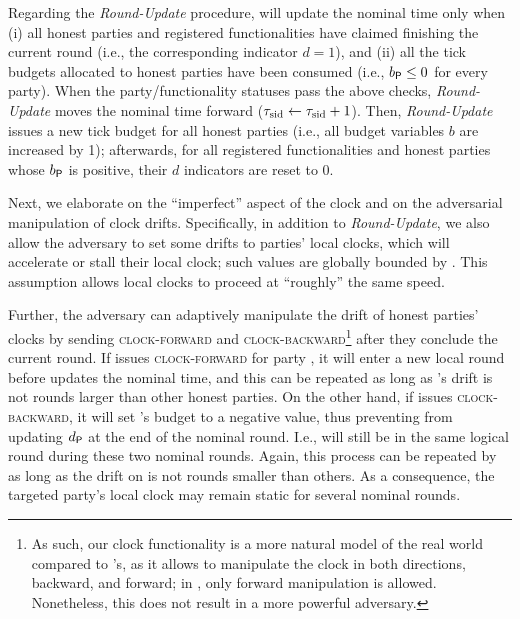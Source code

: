 Regarding the \textit{Round-Update} procedure, \funcImpClock will update the nominal time only when (i) all honest parties and registered functionalities have claimed finishing the current round (i.e., the corresponding indicator $d = 1$), and (ii) all the tick budgets allocated to honest parties have been consumed (i.e., $b_\mathsf{P} \le 0$ for every party).
%
When the party/functionality statuses pass the above checks, \textit{Round-Update} moves the nominal time forward ($\tau_\mathrm{sid} \gets \tau_\mathrm{sid} + 1$).
%
Then, \textit{Round-Update} issues a new tick budget for all honest parties (i.e., all budget variables $b$ are increased by 1); afterwards, for all registered functionalities and honest parties whose $b_\mathsf{P}$ is positive, their $d$ indicators are reset to 0.

Next, we elaborate on the ``imperfect'' aspect of the clock and on the adversarial manipulation of clock drifts.
%
Specifically, in addition to \textit{Round-Update}, we also allow the adversary to set some drifts to parties' local clocks, which will accelerate or stall their local clock; such values are globally bounded by \maxdrift.
%
This assumption allows local clocks to proceed at ``roughly'' the same speed.

Further, the adversary \adv can adaptively manipulate the drift of honest parties' clocks by sending \textsc{clock-forward} and \textsc{clock-backward}\footnote{As such, our clock functionality is a more natural model of the real world compared to \cite{EC:BGKRZ21}'s, as it allows \adv to manipulate the clock in both directions, backward, and forward; in \cite{EC:BGKRZ21}, only forward manipulation is allowed. Nonetheless, this does not result in a more powerful adversary.} after they conclude the current round.
%
If \adv issues \textsc{clock-forward} for party \party, it will enter a new local round before \funcImpClock updates the nominal time, and this can be repeated as long as \party's drift is not \maxdrift rounds larger than other honest parties.
%
On the other hand, if \adv issues \textsc{clock-backward}, it will set \party's budget to a negative value, thus preventing \funcImpClock from updating $d_\mathsf{P}$ at the end of the nominal round.
%
I.e., \party will still be in the same logical round during these two nominal rounds.
%
Again, this process can be repeated by \adv as long as the drift on \party is not \maxdrift rounds smaller than others.
%
As a consequence, the targeted party's local clock may remain static for several nominal rounds.



